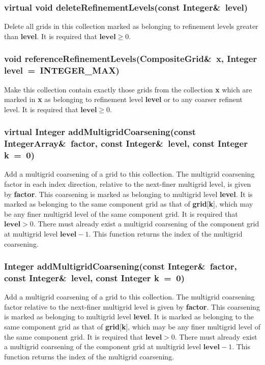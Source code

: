 \documentclass{article}
\begin{document}
  \subsubsection{virtual void deleteRefinementLevels(const Integer\&~level)}
  \label{CompositeGrid::deleteRefinementLevels(level)}
    Delete all grids in this collection marked as belonging to refinement levels greater than \textbf{level}.
    It is required that $\textbf{level}\ge0$.

  \subsubsection{void referenceRefinementLevels(CompositeGrid\&~x,  Integer level~=~INTEGER\_MAX)}
  \label{CompositeGrid::referenceRefinementLevels(x,level)}
    Make this collection contain exactly those grids from the collection \textbf{x} which are marked in \textbf{x}
    as belonging to refinement level \textbf{level} or to any coarser refinent level.  It is required that
    $\textbf{level}\ge0$.

  \subsubsection{virtual Integer addMultigridCoarsening(const IntegerArray\&~factor, const Integer\&~level, const Integer k~=~0)}
  \label{CompositeGrid::addMultigridCoarsening(array_factor,level,k)}
    Add a multigrid coarsening of a grid to this collection.
    The multigrid coarsening factor in each index direction, relative to the next-finer multigrid level, is given by \textbf{factor}.
    This coarsening is marked as belonging to multigrid level \textbf{level}.
    It is marked as belonging to the same component grid as that of \textbf{grid}[\textbf{k}], which may be any finer multigrid level
    of the same component grid.  It is required that $\textbf{level}>0$.
    There must already exist a multigrid coarsening of the component grid at multigrid level $\textbf{level}-1$.
    This function returns the index of the multigrid coarsening.

  \subsubsection{Integer addMultigridCoarsening(const Integer\&~factor, const Integer\&~level, const Integer k~=~0)}
  \label{CompositeGrid::addMultigridCoarsening(factor,level,k)}
    Add a multigrid coarsening of a grid to this collection.
    The multigrid coarsening factor relative to the next-finer multigrid level is given by \textbf{factor}.
    This coarsening is marked as belonging to multigrid level \textbf{level}.
    It is marked as belonging to the same component grid as that of \textbf{grid}[\textbf{k}], which may be any finer multigrid level
    of the same component grid.  It is required that $\textbf{level}>0$.
    There must already exist a multigrid coarsening of the component grid at multigrid level $\textbf{level}-1$.
    This function returns the index of the multigrid coarsening.
\end{document}
